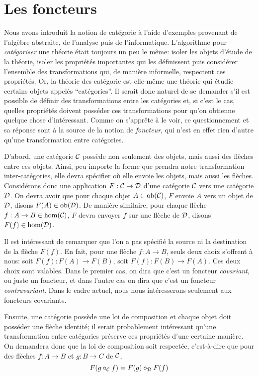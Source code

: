 \section{Les foncteurs}
Nous avons introduit la notion de catégorie à l'aide d'exemples provenant de
l'algèbre abstraite, de l'analyse puis de l'informatique. L'algorithme pour
\textit{catégoriser} une théorie était toujours un peu le même: isoler les
objets d'étude de la théorie, isoler les propriétés importantes qui les
définissent puis considérer l'ensemble des transformations qui, de manière
informelle, respectent ces propriétés. Or, la théorie des catégorie est
elle-même une théorie qui étudie certains objets appelés ``catégories''.
Il serait donc naturel de se demander s'il est possible de définir des
transformations entre les catégories et, si c'est le cas, quelles propriétés
doivent posséder ces transformations pour qu'on obtienne quelque chose
d'intéressant. Comme on s'apprête à le voir, ce questionnement et sa
réponse sont à la source de la notion de \textit{foncteur}, qui n'est
en effet rien d'autre qu'une transformation entre catégories.

D'abord, une catégorie $\mathcal{C}$ possède non seulement des objets, mais aussi
des flèches entre ces objets. Ainsi, peu importe la forme que prendra notre
transformation inter-catégories, elle devra spécifier où elle envoie les
objets, mais aussi les flèches. Considérons donc une application $F : \mathcal{C} \to \mathcal{D}$
d'une catégorie $\mathcal{C}$ vers une catégorie $\mathcal{D}$. On devra avoir que pour chaque
objet $A \in \mathrm{ob}(\mathcal{C})$, $F$ envoie $A$ vers un objet de $\mathcal{D}$, disons
$F(A) \in \mathrm{ob}(\mathcal{D})$. De manière similaire, pour chaque flèche
$f : A \to B \in \hom(\mathcal{C})$, $F$ devra envoyer $f$ sur une flèche
de $\mathcal{D}$, disons $F(f) \in \hom(\mathcal{D})$.

Il est intéressant de remarquer que l'on a pas spécifié la source ni la
destination de la flèche $F(f)$. En fait, pour une flèche $f : A \to B$,
seuls deux choix s'offrent à nous: soit $F(f) : F(A) \to F(B)$, soit
$F(f) : F(B) \to F(A)$. Ces deux choix sont valables. Dans le premier cas,
on dira que c'est un foncteur \textit{covariant}, ou juste un foncteur, et
dans l'autre cas on dira que c'est un foncteur \textit{contravariant}. Dans
le cadre actuel, nous nous intéresserons seulement aux foncteurs covariants.

Ensuite, une catégorie possède une loi de composition et chaque objet doit
posséder une flèche identité; il serait probablement intéressant qu'une
transformation entre catégories préserve ces propriétés d'une certaine manière.
On demandera donc que la loi de composition soit respectée, c'est-à-dire que
pour des flèches $f : A \to B$ et $g : B \to C$ de $\mathcal{C}$,
\[
    F(g \circ_{\mathcal{C}} f) = F(g) \circ_{\mathcal{D}} F(f)
\]

